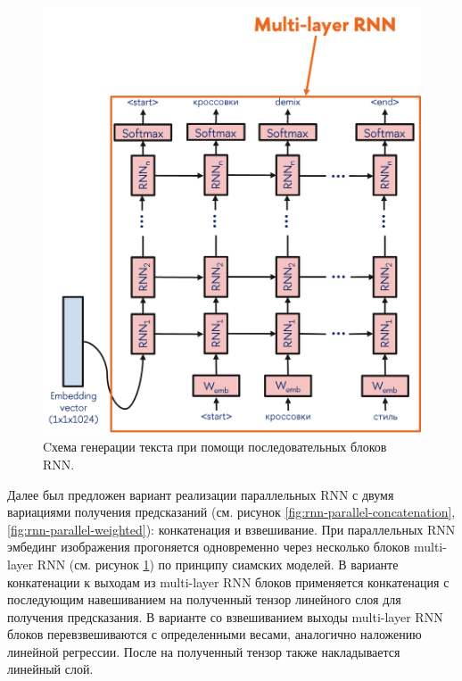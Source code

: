 \documentclass[a4paper,12pt]{extarticle}
\begin{document}
\begin{figure}[ht]
	\centering
	\includegraphics[scale=0.7]{rnn-multilayer.png}
	\caption{Cхема генерации текста при помощи последовательных блоков RNN.}
	\label{fig:rnn-multilayer}
\end{figure}
Далее был предложен вариант реализации параллельных RNN с двумя вариациями получения предсказаний (см. рисунок \ref{fig:rnn-parallel-concatenation}, \ref{fig:rnn-parallel-weighted}): конкатенация и взвешивание. При параллельных RNN эмбединг изображения прогоняется одновременно через несколько блоков multi-layer RNN (см. рисунок \ref{fig:rnn-multilayer}) по принципу сиамских моделей. В варианте конкатенации к выходам из multi-layer RNN блоков применяется конкатенация с последующим навешиванием на полученный тензор линейного слоя для получения предсказания. В варианте со взвешиванием выходы multi-layer RNN блоков перевзвешиваются с определенными весами, аналогично наложению линейной регрессии. После на полученный тензор также накладывается линейный слой.
\end{document}
